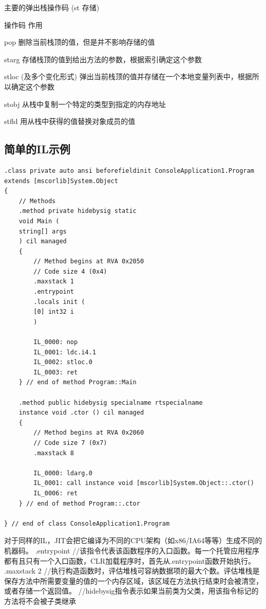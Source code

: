 \documentclass{book}
\begin{document}
主要的弹出栈操作码 (st 存储)

操作码                                           作用

pop                                              删除当前栈顶的值，但是并不影响存储的值

starg                                            存储栈顶的值到给出方法的参数，根据索引确定这个参数

stloc (及多个变化形式)                      弹出当前栈顶的值并存储在一个本地变量列表中，根据所以确定这个参数

stobj                                            从栈中复制一个特定的类型到指定的内存地址

stfld                                             用从栈中获得的值替换对象成员的值

\subsection{简单的IL示例}


\begin{lstlisting}[language={[Sharp]C}]
.class private auto ansi beforefieldinit ConsoleApplication1.Program
extends [mscorlib]System.Object
{
	// Methods
	.method private hidebysig static 
	void Main (
	string[] args
	) cil managed 
	{
		// Method begins at RVA 0x2050
		// Code size 4 (0x4)
		.maxstack 1
		.entrypoint
		.locals init (
		[0] int32 i
		)
		
		IL_0000: nop
		IL_0001: ldc.i4.1
		IL_0002: stloc.0
		IL_0003: ret
	} // end of method Program::Main
	
	.method public hidebysig specialname rtspecialname 
	instance void .ctor () cil managed 
	{
		// Method begins at RVA 0x2060
		// Code size 7 (0x7)
		.maxstack 8
		
		IL_0000: ldarg.0
		IL_0001: call instance void [mscorlib]System.Object::.ctor()
		IL_0006: ret
	} // end of method Program::.ctor

} // end of class ConsoleApplication1.Program
\end{lstlisting}

对于同样的IL，JIT会把它编译为不同的CPU架构（如x86/IA64等等）生成不同的机器码。
.entrypoint //该指令代表该函数程序的入口函数。每一个托管应用程序都有且只有一个入口函数，CLR加载程序时，首先从.entrypoint函数开始执行。
.maxstack 2 //执行构造函数时，评估堆栈可容纳数据项的最大个数。评估堆栈是保存方法中所需要变量的值的一个内存区域，该区域在方法执行结束时会被清空，或者存储一个返回值。
//hidebysig指令表示如果当前类为父类，用该指令标记的方法将不会被子类继承
\end{document}
